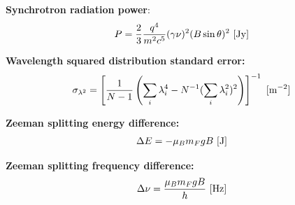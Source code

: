 \documentclass[a4paper,11pt]{article}
\begin{document}
{\noindent}\textbf{Synchrotron radiation power}:
\begin{align*}
P = \frac{2}{3}\dfrac{q^4}{m^2c^5}(\gamma\nu)^2(B\sin\theta)^2 ~ [{\rm Jy}]
\end{align*}

{\noindent}\textbf{Wavelength squared distribution standard error:} 
\begin{align*}
\sigma_{\lambda^2} = \left[ \dfrac{1}{N-1} \left( \sum_i\lambda_i^4 - N^{-1}(\sum_i\lambda_i^2)^2 \right) \right]^{-1} ~ [{\rm m^{-2}}]
\end{align*}

{\noindent}\textbf{Zeeman splitting energy difference:}
\begin{align*}
    \Delta E = -\mu_Bm_FgB ~ [{\rm J}]
\end{align*}

{\noindent}\textbf{Zeeman splitting frequency difference:}
\begin{align*}
    \Delta\nu = \frac{\mu_Bm_FgB}{h} ~ [{\rm Hz}]
\end{align*}
\end{document}
